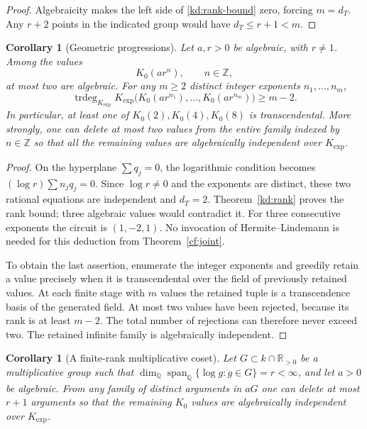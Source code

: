 \documentclass[11pt]{article}
\newtheorem{corollary}[theorem]{Corollary}
\theoremstyle{definition}
\theoremstyle{remark}
\begin{document}
\begin{proof}
Algebraicity makes the left side of \eqref{kd:rank-bound} zero, forcing
$m=d_T$.  Any $r+2$ points in the indicated group would have
$d_T\leq r+1<m$.
\end{proof}

\begin{corollary}[Geometric progressions]\label{kd:geometric}
Let $a,r>0$ be algebraic, with $r\ne1$.  Among the values
\[
                  K_0(ar^n),\qquad n\in\mathbb Z,
\]
at most two are algebraic.  For any $m\geq2$ distinct integer exponents
$n_1,\ldots,n_m$,
\[
 \operatorname{trdeg}_{K_{\exp}}
 K_{\exp}\bigl(K_0(ar^{n_1}),\ldots,K_0(ar^{n_m})\bigr)
 \geq m-2.
\]
In particular, at least one of $K_0(2),K_0(4),K_0(8)$ is transcendental.
More strongly, one can delete at most two values from the entire
family indexed by $n\in\mathbb Z$ so that all the remaining values are
algebraically independent over $K_{\exp}$.
\end{corollary}

\begin{proof}
On the hyperplane $\sum q_j=0$, the logarithmic condition becomes
$(\log r)\sum n_jq_j=0$.  Since $\log r\ne0$ and the exponents are
distinct, these two rational equations are independent and $d_T=2$.
Theorem~\ref{kd:rank} proves the rank bound; three algebraic values
would contradict it.  For three consecutive exponents the circuit is
$(1,-2,1)$.  No invocation of Hermite--Lindemann is needed for this
deduction from Theorem~\ref{cf:joint}.

To obtain the last assertion, enumerate the integer exponents and
greedily retain a value precisely when it is transcendental over the
field of previously retained values.  At each finite stage with $m$
values the retained tuple is a transcendence basis of the generated
field.  At most two values have been rejected, because its rank is at
least $m-2$.  The total number of rejections can therefore never exceed
two.  The retained infinite family is algebraically independent.
\end{proof}

\begin{corollary}[A finite-rank multiplicative coset]
\label{kd:coset}
Let $G\subset k\cap\mathbb R_{>0}$ be a multiplicative group such that
$\dim_{\mathbb Q}\operatorname{span}_{\mathbb Q}\{\log g:g\in G\}=r<\infty$,
and let $a>0$ be algebraic.  From any family of distinct arguments in
$aG$ one can delete at most $r+1$ arguments so that the remaining
$K_0$ values are algebraically independent over $K_{\exp}$.
\end{corollary}
\end{document}
